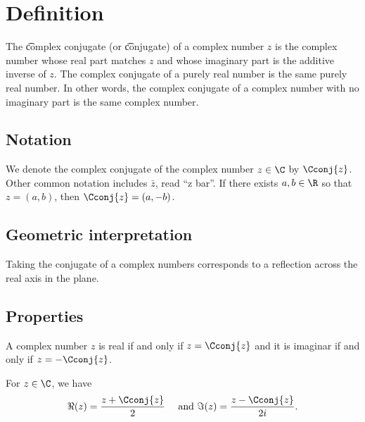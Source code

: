 

\section*{Definition}

The \t{complex conjugate} (or \t{conjugate}) of a complex number $z$ is the complex number whose real part matches $z$ and whose imaginary part is the additive inverse of $z$.
The complex conjugate of a purely real number is the same purely real number.
In other words, the complex conjugate of a complex number with no imaginary part is the same complex number.

\subsection*{Notation}

We denote the complex conjugate of the complex number $z \in \C $ by $\Cconj{z}$.
Other common notation includes $\bar{z}$, read ``z bar''.
If there exists $a, b \in \R $ so that $z = (a, b)$, then $\Cconj{z} = (a, -b)$.

\subsection*{Geometric interpretation}

Taking the conjugate of a complex numbers corresponds to a reflection across the real axis in the plane.

\subsection*{Properties}

A complex number $z$ is real if and only if $z = \Cconj{z}$ and it is imaginar if and only if $z = -\Cconj{z}$.

\begin{proposition}
For $z \in \C $, we have
\[
\Re (z) = \frac{z + \Cconj{z}}{2} \quad \text{ and } \Im (z) = \frac{z - \Cconj{z}}{2i}.
\]
\end{proposition}

\blankpage